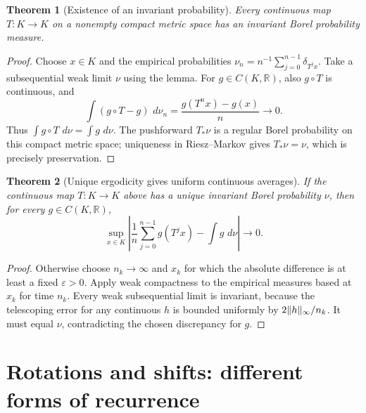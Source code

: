 \documentclass[11pt,oneside]{book}
\newtheorem{theorem}{Theorem}[chapter]
\theoremstyle{definition}
\theoremstyle{remark}\newtheorem{remark}[theorem]{Remark}
\newcommand{\R}{\mathbb R}\newcommand{\C}{\mathbb C}
\newcommand{\dd}{\,d}\newcommand{\id}{\operatorname{id}}
\begin{document}
\begin{theorem}[Existence of an invariant probability]\label{d13:19:invariant-probability}
Every continuous map \(T:K\to K\) on a nonempty compact metric
space has an invariant Borel probability measure.
\end{theorem}
\begin{proof}
Choose \(x\in K\) and the empirical probabilities
\(\nu_n=n^{-1}\sum_{j=0}^{n-1}\delta_{T^jx}\).
Take a subsequential weak limit \(\nu\) using the lemma.
For \(g\in C(K,\R)\), also \(g\circ T\) is continuous, and
\[
 \int(g\circ T-g)\,\dd\nu_n
     =\frac{g(T^nx)-g(x)}n\longrightarrow0 .
\]
Thus \(\int g\circ T\,\dd\nu=\int g\,\dd\nu\).
The pushforward \(T_*\nu\) is a regular Borel probability on this
compact metric space; uniqueness in Riesz--Markov gives
\(T_*\nu=\nu\), which is precisely preservation.
\end{proof}

\begin{theorem}[Unique ergodicity gives uniform continuous averages]\label{d13:19:unique-ergodic-uniform}
If the continuous map \(T:K\to K\) above has a unique invariant
Borel probability \(\nu\), then for every \(g\in C(K,\R)\),
\[
 \sup_{x\in K}\left|\frac1n\sum_{j=0}^{n-1}g(T^jx)
                         -\int g\,\dd\nu\right|\longrightarrow0 .
\]
\end{theorem}
\begin{proof}
Otherwise choose \(n_k\to\infty\) and \(x_k\) for which the absolute
difference is at least a fixed \(\varepsilon>0\). Apply weak
compactness to the empirical measures based at \(x_k\) for time
\(n_k\). Every weak subsequential limit is invariant, because the
telescoping error for any continuous \(h\) is bounded uniformly by
\(2\lVert h\rVert_\infty/n_k\). It must equal \(\nu\), contradicting the
chosen discrepancy for \(g\).
\end{proof}

\section{Rotations and shifts: different forms of recurrence}
\end{document}
